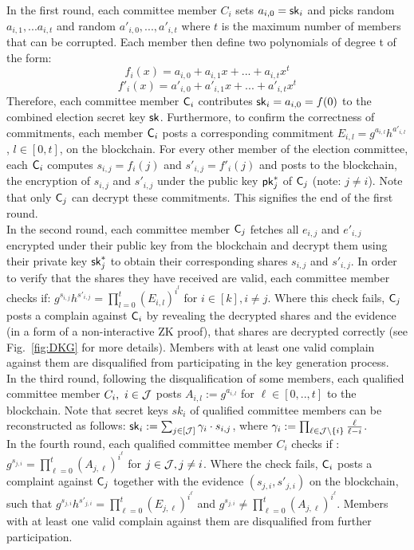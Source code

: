 In the first round, each committee member $C_i$ sets $a_{i,0}=\mathsf{sk}_{i}$ and picks random $a_{i,1},...a_{i,t} $ and random $ a'_{i,0},...,a'_{i,t}$ where $t$ is the maximum number of members that can be corrupted. Each member then define two polynomials of degree t of the form:
\[ f_i(x) = a_{i,0}+a_{i,1}x+...+a_{i,t}x^t \]
\[ f'_i(x) = a'_{i,0}+a'_{i,1}x+...+a'_{i,t}x^t \]
Therefore, each committee member $\mathsf{C}_i$ contributes $\mathsf{sk}_{i} = a_{i,0} = f(0)$ to the combined election secret key $\mathsf{sk}$.
Furthermore, to confirm the correctness of commitments, each member $\mathsf{C}_i$ posts a corresponding commitment $E_{i,l} = g^{a_{i,l}}h^{a'_{i,l}}$, $l \in [0,t]$, on the blockchain. For every other member of the election committee, each $\mathsf{C}_i$ computes $s_{i,j} = f_i(j) $ and $s'_{i,j} = f'_{i}(j) $ and posts to the blockchain, the encryption of $s_{i,j}$ and $ s'_{i,j}$ under the public key $\mathsf{pk}^*_{j}$ of $\mathsf{C}_j$ (note: $j \neq i$). Note that only $\mathsf{C}_j$ can decrypt these commitments. This signifies the end of the first round.\\

In the second round, each committee member $\mathsf{C}_j$ fetches all $e_{i,j}$ and $e'_{i,j}$ encrypted under their public key from the blockchain and decrypt them using their private key $\mathsf{sk}^*_{j}$ to obtain their corresponding shares $s_{i,j}$ and $ s'_{i,j}$. In order to verify that the shares they have received are valid, each committee member checks if: $g^{s_{i,j}}h^{s'_{i,j}} = \prod_{l=0}^{t}(E_{i,l})^{i^l}$ for $i \in [k], i \neq j$.  Where this check fails, $\mathsf{C}_j$ posts a complain against $\mathsf{C}_i$ by revealing the decrypted shares and the evidence (in a form of a non-interactive ZK proof), that shares are decrypted correctly (see Fig.~\ref{fig:DKG} for more details).
Members with at least one valid complain against them are disqualified from participating in the key generation process.\\

In the third round, following the disqualification of some members, each qualified committee member $C_i,~i\in\mathcal{J}$ posts $A_{i,l} := g^{a_{i,l}}$ for $ \ell \in [0,..,t] $ to the blockchain. Note that secret keys $sk_{i}$ of qualified committee members can be reconstructed as follows: $\mathsf{sk}_{i} := \sum_{j\in[\mathcal{J}]} \gamma_{i} \cdot s_{i,j}$, where $\gamma_{i}:= \prod_{\ell\in \mathcal{J}\setminus \{i\} } \frac{\ell}{\ell-i}$.\\

In the fourth round, each qualified committee member $C_i$ checks  if : $g^{s_{j,i}}= \prod_{\ell=0}^{t} (A_{j,\ell})^{i^\ell}$ for $j\in\mathcal{J}, j\neq i$. Where the check fails, $\mathsf{C}_i$ posts a complaint against $\mathsf{C}_j$ together with the evidence $(s_{j,i},s'_{j,i})$ on the blockchain, such that $g^{s_{j,i}}h^{s'_{j,i}}= \prod_{\ell=0}^{t} (E_{j,\ell})^{i^\ell}$ and $g^{s_{j,i}}\neq  \prod_{\ell=0}^{t} (A_{j,\ell})^{i^\ell}$. Members with at least one valid complain against them are disqualified from further participation. \\

